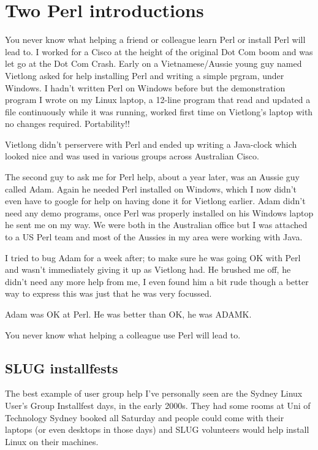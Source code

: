\documentclass{article}
\begin{document}
\section{Two Perl introductions}

You never know what helping a friend or colleague learn Perl or
install Perl will lead to. I worked for a Cisco at the height of the
original Dot Com boom and was let go at the Dot Com Crash. Early on a
Vietnamese/Aussie young guy named Vietlong asked for help installing
Perl and writing a simple prgram, under Windows. I hadn't written Perl
on Windows before but the demonstration program I wrote on my Linux
laptop, a 12-line program that read and updated a file continuously
while it was running, worked first time on Vietlong's laptop with no
changes required. Portability!!

Vietlong didn't perservere with Perl and ended up writing a Java-clock
which looked nice and was used in various groups across Australian
Cisco.

The second guy to ask me for Perl help, about a year later, was an
Aussie guy called Adam. Again he needed Perl installed on Windows,
which I now didn't even have to google for help on having done it for
Vietlong earlier. Adam didn't need any demo programs, once Perl was
properly installed on his Windows laptop he sent me on my way. We were
both in the Australian office but I was attached to a US Perl team and
most of the Aussies in my area were working with Java.

I tried to bug Adam for a week after; to make sure he was going OK
with Perl and wasn't immediately giving it up as Vietlong had. He
brushed me off, he didn't need any more help from me, I even found him
a bit rude though a better way to express this was just that he was
very focussed.

Adam was OK at Perl. He was better than OK, he was ADAMK.

You never know what helping a colleague use Perl will lead to.

\subsection{SLUG installfests}

The best example of user group help I've personally seen are the
Sydney Linux User's Group Installfest days, in the early 2000s. They
had some rooms at Uni of Technology Sydney booked all Saturday and
people could come with their laptops (or even desktops in those days)
and SLUG volunteers would help install Linux on their machines.
\end{document}

